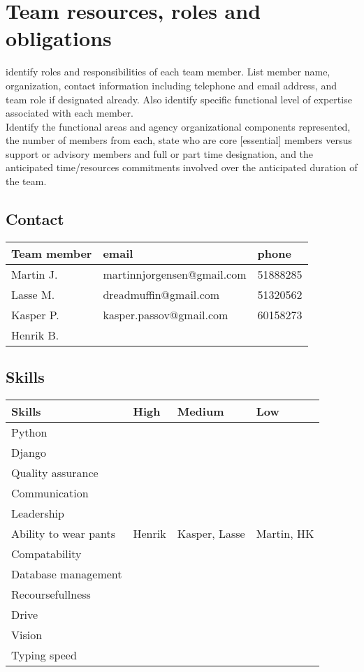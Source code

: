 \section{Team resources, roles and obligations} identify roles and
responsibilities of each team member. List member name, organization,
contact information including telephone and email address, and team role
if designated already. Also identify specific functional level of expertise
associated with each member.\\ Identify the functional areas and agency
organizational components represented, the number of members from each, state
who are core [essential] members versus support or advisory members and full or
part time designation, and the anticipated time/resources commitments involved
over the anticipated duration of the team.

\subsection{Contact}
\begin{table}
    \centering
    \begin{tabular}{l|l|l}
        \rowcolor{Gray}
        \textbf{Team member} & \textbf{email} & \textbf{phone} \\\hline
        Martin J.            & martinnjorgensen@gmail.com & 51888285\\
        Lasse M.             & dreadmuffin@gmail.com & 51320562\\
        Kasper P.            & kasper.passov@gmail.com & 60158273\\
        Henrik B.            & & 
    \end{tabular}
    \label{tab:contact}
\end{table}


\subsection{Skills}
\begin{table}
    \centering
    \begin{tabular}{l|l|l|l}
        \rowcolor{Gray}
        \textbf{Skills} & \textbf{High} & \textbf{Medium} & \textbf{Low}\\\hline
        Python & & &\\
        Django & & &\\
        Quality assurance & & &\\
        Communication & & &\\
        Leadership & & &\\
        Ability to wear pants & Henrik & Kasper, Lasse & Martin, HK\\
        Compatability & & &\\
        Database management & & &\\
        Recoursefullness & & &\\
        Drive & & &\\
        Vision & & &\\
        Typing speed & & &\\
    \end{tabular}
    \label{tab:Skillz}
\end{table}

